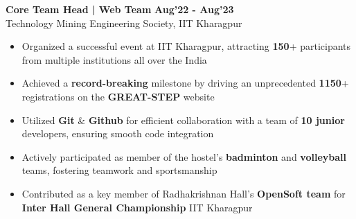 \documentclass[10pt]{article}
\begin{document}
\vspace{-1ex}
\iffalse
\fi
\vspace{-1ex}
{\color{headliner} \spacedhrule{0.15ex}{2.0ex}}
\vspace{-1ex}
\large { \textbf{Core Team Head | Web Team }}\normalsize
{\hfill} \textbf{Aug'22 - Aug'23}\\\normalsize Technology Mining Engineering Society, IIT Kharagpur \\[-1.6em]
\begin{itemize}
    \item Organized a successful event at IIT Kharagpur, attracting \textbf{150}+ participants from multiple institutions all over the India\\[-1.9em]
    \item Achieved a \textbf{record-breaking} milestone by driving an unprecedented \textbf{1150}+ registrations on the \textbf{GREAT-STEP} website\\[-1.9em]
    \item Utilized \textbf{Git} \& \textbf{Github} for efficient collaboration with a team of \textbf{10 junior} developers, ensuring smooth code integration\\[-1.9em]
\end{itemize}

\vspace{-1ex}
{\color{headliner} \spacedhrule{0.15ex}{1.0ex}}

\begin{itemize}[leftmargin=*]
\item Actively participated as member of the hostel's \textbf{badminton} and \textbf{volleyball} teams, fostering teamwork and sportsmanship \\[-1.8em]
\item Contributed as a key member of Radhakrishnan Hall's \textbf{OpenSoft team} for \textbf{Inter Hall General Championship} IIT Kharagpur\\[-1.8em]
\end{itemize}

\vspace{1ex}
\end{document}
